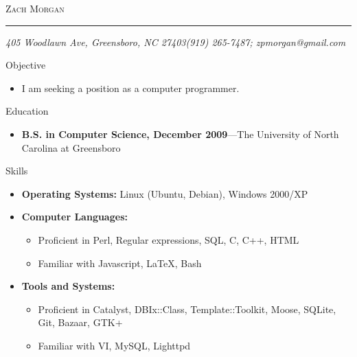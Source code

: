\documentclass[12pt,oneside]{article}
\makeatletter
\newcommand{\name}{Zach Morgan}
\newcommand{\addr}{405 Woodlawn Ave, Greensboro, NC 27403}
\newcommand{\phone}{(919) 265-7487}
\newcommand{\email}{zpmorgan@gmail.com}
\newcommand{\bigname}[1]{
	\begin{center}\fontfamily{phv}\selectfont\Huge\scshape#1\end{center}
}
\newenvironment{ressection}[1]{
	\vspace{4pt}
	{\fontfamily{phv}\selectfont\Large#1}
	\begin{itemize}
	\vspace{3pt}
}{
	\end{itemize}
}
\newcommand{\resitem}[1]{
	\vspace{-4pt}
	\item \begin{flushleft} #1 \end{flushleft}
}
\newcommand{\ressubitem}[1]{
	\vspace{-1pt}
	\item \begin{flushleft} #1 \end{flushleft}
}
\newcommand{\resbigitem}[3]{
	\vspace{-5pt}
	\item
	\textbf{#1}---#2 \\
	\textit{#3}
}
\newenvironment{ressubsec}[3]{
	\resbigitem{#1}{#2}{#3}
	\vspace{-2pt}
	\begin{itemize}
}{
	\end{itemize}
}
\newenvironment{reslist}[1]{
	\resitem{\textbf{#1}}
	\vspace{-5pt}
	\begin{itemize}
}{
	\end{itemize}
}
\makeatother
\begin{document}
 \selectfont

\bigname{\name}

\vspace{-8pt} \rule{\textwidth}{1pt}

\vspace{-1pt} {\small\itshape \addr \hfill \phone; \email}

\vspace{8 pt}




\begin{ressection}{Objective}

   \resitem{I am seeking a position as a computer programmer.}
	
\end{ressection}


\begin{ressection}{Education}

	\begin{ressubsec}{B.S. in Computer Science, December 2009}{The University of North Carolina at Greensboro}{}
	\end{ressubsec}

\end{ressection}


\begin{ressection}{Skills}

	\resitem{\textbf{Operating Systems:} Linux (Ubuntu, Debian), Windows 2000/XP}

	\begin{reslist}{Computer Languages:}

		\ressubitem{Proficient in Perl, Regular expressions, SQL, C, C++, HTML}

		\ressubitem{Familiar with Javascript, \LaTeX, Bash}

	\end{reslist}

	\begin{reslist}{Tools and Systems:}

		\ressubitem{Proficient in Catalyst, DBIx::Class, Template::Toolkit, Moose, SQLite, Git, Bazaar, GTK+}

		\ressubitem{Familiar with VI, MySQL, Lighttpd}

	\end{reslist}


\end{ressection}
\end{document}
